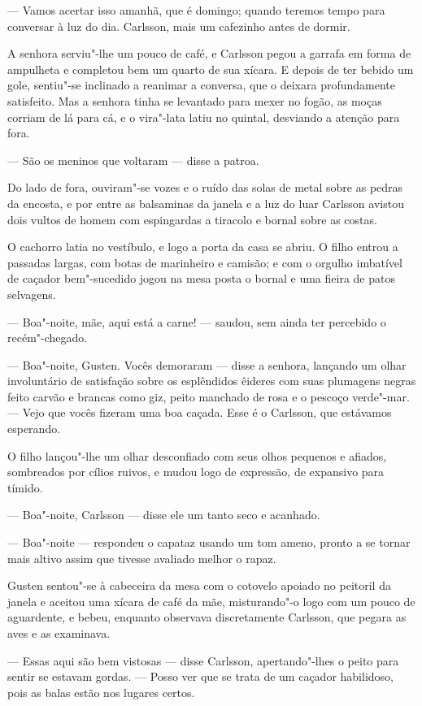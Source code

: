 --- Vamos acertar isso amanhã, que é domingo; quando teremos tempo para conversar
à luz do dia. Carlsson, mais um cafezinho antes de dormir.

A senhora serviu"-lhe um pouco de café, e Carlsson pegou a garrafa em forma de
ampulheta e completou bem um quarto de sua xícara. E depois de ter bebido um
gole, sentiu"-se inclinado a reanimar a conversa, que o deixara profundamente
satisfeito. Mas a senhora tinha se levantado para mexer no fogão, as moças
corriam de lá para cá, e o vira"-lata latiu no quintal, desviando a atenção para fora.

--- São os meninos que voltaram --- disse a patroa.

Do lado de fora, ouviram"-se vozes e o ruído das solas de metal sobre as pedras
da encosta, e por entre as balsaminas da janela e a luz do luar Carlsson avistou
dois vultos de homem com espingardas a tiracolo e bornal sobre as costas.

O cachorro latia no vestíbulo, e logo a porta da casa se abriu. O filho entrou
a passadas largas, com botas de marinheiro e camisão; e com o orgulho
imbatível de caçador bem"-sucedido jogou na mesa posta o bornal e uma fieira de
patos selvagens.

--- Boa"-noite, mãe, aqui está a carne! --- saudou, sem ainda ter percebido o
recém"-chegado.

--- Boa"-noite, Gusten. Vocês demoraram --- disse a senhora, lançando um
 olhar involuntário  de satisfação sobre os esplêndidos êideres com suas plumagens
negras feito carvão e brancas como giz, peito manchado de rosa e o pescoço
verde"-mar. --- Vejo que vocês fizeram uma boa caçada. Esse é o Carlsson, que
estávamos esperando.

O filho lançou"-lhe um olhar desconfiado com seus olhos pequenos e afiados,
sombreados por cílios ruivos, e mudou logo de expressão, de expansivo para
tímido.

--- Boa"-noite, Carlsson --- disse ele um tanto seco e acanhado.

--- Boa"-noite --- respondeu o capataz usando um tom ameno, pronto a se tornar
mais altivo assim que tivesse avaliado melhor o rapaz.

Gusten sentou"-se à cabeceira da mesa com o cotovelo apoiado no peitoril da
janela e aceitou uma xícara de café da mãe, misturando"-o logo com um pouco de
aguardente, e bebeu, enquanto observava discretamente Carlsson, que pegara as
aves e as examinava.

--- Essas aqui são bem vistosas --- disse Carlsson, apertando"-lhes o peito para
sentir se estavam gordas. --- Posso ver que se trata de um caçador habilidoso,
pois as balas estão nos lugares certos.

